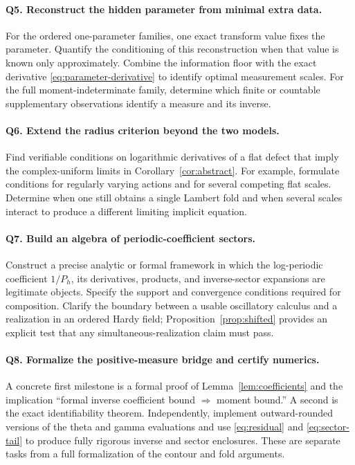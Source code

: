 \documentclass[11pt,a4paper]{article}
\numberwithin{equation}{section}
\theoremstyle{definition}
\theoremstyle{remark}
\begin{document}
\paragraph{Q5. Reconstruct the hidden parameter from minimal extra data.}
For the ordered one-parameter families, one exact transform value fixes
the parameter. Quantify the conditioning of this reconstruction when
that value is known only approximately. Combine the information floor
with the exact derivative \eqref{eq:parameter-derivative} to identify
optimal measurement scales. For the full moment-indeterminate family,
determine which finite or countable supplementary observations identify
a measure and its inverse.

\paragraph{Q6. Extend the radius criterion beyond the two models.}
Find verifiable conditions on logarithmic derivatives of a flat defect
that imply the complex-uniform limits in
Corollary~\ref{cor:abstract}. For example, formulate conditions for
regularly varying actions and for several competing flat scales.
Determine when one still obtains a single Lambert fold and when several
scales interact to produce a different limiting implicit equation.

\paragraph{Q7. Build an algebra of periodic-coefficient sectors.}
Construct a precise analytic or formal framework in which the
log-periodic coefficient \(1/P_h\), its derivatives, products, and
inverse-sector expansions are legitimate objects. Specify the support
and convergence conditions required for composition. Clarify the
boundary between a usable oscillatory calculus and a realization in an
ordered Hardy field; Proposition~\ref{prop:shifted} provides an explicit
test that any simultaneous-realization claim must pass.

\paragraph{Q8. Formalize the positive-measure bridge and certify numerics.}
A concrete first milestone is a formal proof of
Lemma~\ref{lem:coefficients} and the implication
``formal inverse coefficient bound \(\Rightarrow\) moment bound.''
A second is the exact identifiability theorem. Independently, implement
outward-rounded versions of the theta and gamma evaluations and use
\eqref{eq:residual} and \eqref{eq:sector-tail} to produce fully rigorous
inverse and sector enclosures. These are separate tasks from a full
formalization of the contour and fold arguments.
\end{document}
